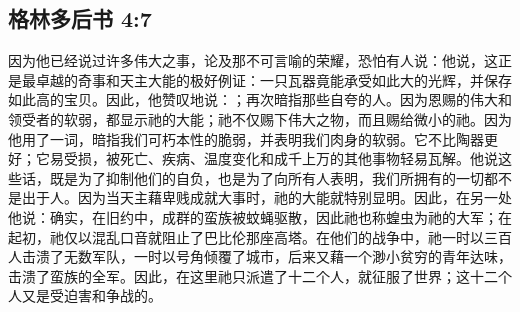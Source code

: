 
\subsection{格林多后书 4:7}

\par

因为他已经说过许多伟大之事，论及那不可言喻的荣耀，恐怕有人说：他说，这正是最卓越的奇事和天主大能的极好例证：一只瓦器竟能承受如此大的光辉，并保存如此高的宝贝。因此，他赞叹地说：；再次暗指那些自夸的人。因为恩赐的伟大和领受者的软弱，都显示祂的大能；祂不仅赐下伟大之物，而且赐给微小的祂。因为他用了一词，暗指我们可朽本性的脆弱，并表明我们肉身的软弱。它不比陶器更好；它易受损，被死亡、疾病、温度变化和成千上万的其他事物轻易瓦解。他说这些话，既是为了抑制他们的自负，也是为了向所有人表明，我们所拥有的一切都不是出于人。因为当天主藉卑贱成就大事时，祂的大能就特别显明。因此，在另一处他说：确实，在旧约中，成群的蛮族被蚊蝇驱散，因此祂也称蝗虫为祂的大军；在起初，祂仅以混乱口音就阻止了巴比伦那座高塔。在他们的战争中，祂一时以三百人击溃了无数军队，一时以号角倾覆了城市，后来又藉一个渺小贫穷的青年达味，击溃了蛮族的全军。因此，在这里祂只派遣了十二个人，就征服了世界；这十二个人又是受迫害和争战的。\par

